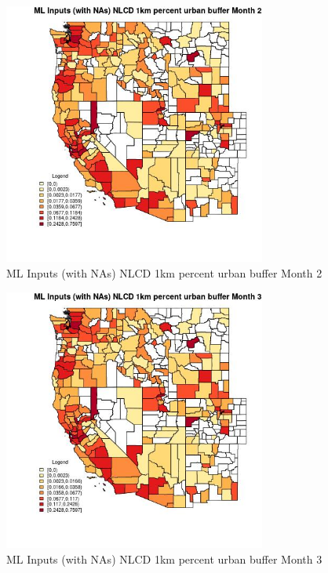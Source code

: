 \begin{figure} 
\centering  
\includegraphics[width=0.77\textwidth]{Code_Outputs/Report_ML_input_PM25_Step4_part_f_de_duplicated_aves_prioritize_24hr_obswNAs_CountyNLCD_1km_percent_urban_buffermedianMonth2.jpg} 
\caption{\label{fig:Report_ML_input_PM25_Step4_part_f_de_duplicated_aves_prioritize_24hr_obswNAsCountyNLCD_1km_percent_urban_buffermedianMonth2}ML Inputs (with NAs) NLCD 1km percent urban buffer Month 2} 
\end{figure} 
 

\begin{figure} 
\centering  
\includegraphics[width=0.77\textwidth]{Code_Outputs/Report_ML_input_PM25_Step4_part_f_de_duplicated_aves_prioritize_24hr_obswNAs_CountyNLCD_1km_percent_urban_buffermedianMonth3.jpg} 
\caption{\label{fig:Report_ML_input_PM25_Step4_part_f_de_duplicated_aves_prioritize_24hr_obswNAsCountyNLCD_1km_percent_urban_buffermedianMonth3}ML Inputs (with NAs) NLCD 1km percent urban buffer Month 3} 
\end{figure} 
 

